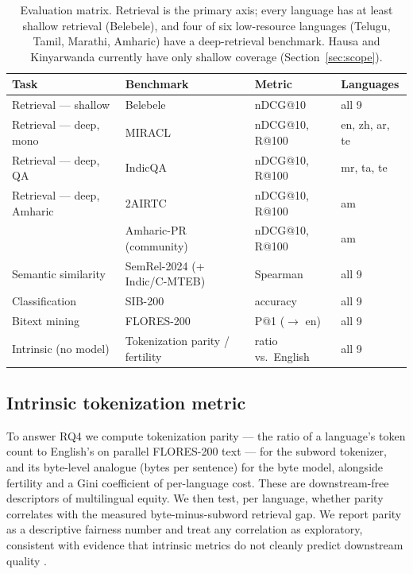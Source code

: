 \documentclass[11pt]{article}
\begin{document}
\begin{table}[t]
\centering
\small
\renewcommand{\arraystretch}{1.15}
\begin{tabular}{l l l l}
\toprule
Task & Benchmark & Metric & Languages\\
\midrule
Retrieval --- shallow        & Belebele \citep{bandarkar2023belebele}      & nDCG@10           & all 9\\
Retrieval --- deep, mono     & MIRACL \citep{zhang2023miracl}              & nDCG@10, R@100    & en, zh, ar, te\\
Retrieval --- deep, QA       & IndicQA \citep{doddapaneni2023indicxtreme}  & nDCG@10, R@100    & mr, ta, te\\
Retrieval --- deep, Amharic  & 2AIRTC \citep{yeshambel2020twoairtc}        & nDCG@10, R@100    & am\\
                             & Amharic-PR (community)                       & nDCG@10, R@100    & am\\
Semantic similarity          & SemRel-2024 \citep{ousidhoum2024semrel} (+ Indic/C-MTEB) & Spearman & all 9\\
Classification               & SIB-200                                      & accuracy          & all 9\\
Bitext mining                & FLORES-200                                   & P@1 ($\to$ en)    & all 9\\
Intrinsic (no model)         & Tokenization parity / fertility              & ratio vs.\ English & all 9\\
\bottomrule
\end{tabular}
\caption{Evaluation matrix. Retrieval is the primary axis; every language has at least shallow
retrieval (Belebele), and four of six low-resource languages (Telugu, Tamil, Marathi, Amharic) have a
deep-retrieval benchmark. Hausa and Kinyarwanda currently have only shallow coverage
(Section~\ref{sec:scope}).}
\label{tab:eval}
\end{table}

\subsection{Intrinsic tokenization metric}
\label{sec:intrinsic}
To answer RQ4 we compute tokenization parity --- the ratio of a language's token count to English's on
parallel FLORES-200 text --- for the subword tokenizer, and its byte-level analogue (bytes per
sentence) for the byte model, alongside fertility and a Gini coefficient of per-language cost. These
are downstream-free descriptors of multilingual equity. We then test, per language, whether parity
correlates with the measured byte-minus-subword retrieval gap. We report parity as a descriptive
fairness number and treat any correlation as exploratory, consistent with evidence that intrinsic
metrics do not cleanly predict downstream quality \citep{lee2026equity, ali2023tokenizer}.
\end{document}
